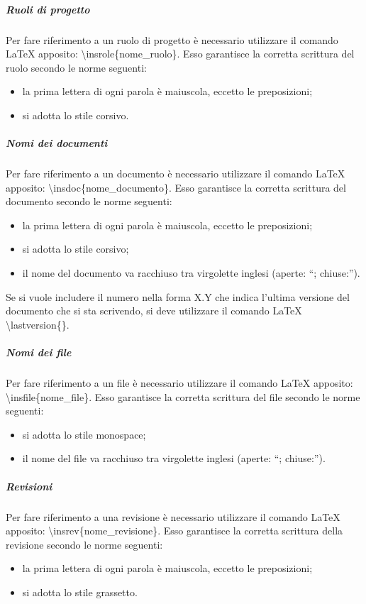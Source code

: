 				\subparagraph{Ruoli di progetto}
					Per fare riferimento a un ruolo di progetto è necessario utilizzare il comando \LaTeX{} apposito: \textbackslash insrole\{nome\_ruolo\}. Esso garantisce la corretta scrittura del ruolo secondo le norme seguenti:
					\begin{itemize}
						\item la prima lettera di ogni parola è maiuscola, eccetto le preposizioni;
						\item si adotta lo stile corsivo.
					\end{itemize}
				\subparagraph{Nomi dei documenti}
					Per fare riferimento a un documento è necessario utilizzare il comando \LaTeX{} apposito: \textbackslash insdoc\{nome\_documento\}. Esso garantisce la corretta scrittura del documento secondo le norme seguenti:
					\begin{itemize}
						\item la prima lettera di ogni parola è maiuscola, eccetto le preposizioni;
						\item si adotta lo stile corsivo;
						\item il nome del documento va racchiuso tra virgolette inglesi (aperte: “; chiuse:”).
					\end{itemize}
					Se si vuole includere il numero nella forma X.Y che indica l’ultima versione del documento che si sta scrivendo, si deve utilizzare il comando \LaTeX{} \textbackslash lastversion\{\}.
				\subparagraph{Nomi dei file}
					Per fare riferimento a un file è necessario utilizzare il comando \LaTeX{} apposito: \textbackslash insfile\{nome\_file\}. Esso garantisce la corretta scrittura del file secondo le norme seguenti:
					\begin{itemize}
						\item si adotta lo stile monospace;
						\item il nome del file va racchiuso tra virgolette inglesi (aperte: “; chiuse:”).
					\end{itemize}
				\subparagraph{Revisioni}
					Per fare riferimento a una revisione è necessario utilizzare il comando \LaTeX{} apposito: \textbackslash insrev\{nome\_revisione\}. Esso garantisce la corretta scrittura della revisione secondo le norme seguenti:
					\begin{itemize}
						\item la prima lettera di ogni parola è maiuscola, eccetto le preposizioni;
						\item si adotta lo stile grassetto.
					\end{itemize}
